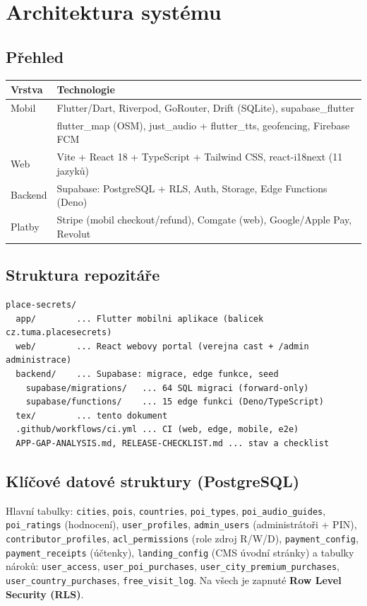 \documentclass[11pt,a4paper]{article}
\newcommand{\code}[1]{\texttt{#1}}
\begin{document}
\section{Architektura systému}

\subsection{Přehled}
\begin{center}
\begin{tabular}{@{}ll@{}}
\toprule
\textbf{Vrstva} & \textbf{Technologie} \\
\midrule
Mobil & Flutter/Dart, Riverpod, GoRouter, Drift (SQLite), supabase\_flutter \\
      & flutter\_map (OSM), just\_audio + flutter\_tts, geofencing, Firebase FCM \\
Web   & Vite + React 18 + TypeScript + Tailwind CSS, react-i18next (11 jazyků) \\
Backend & Supabase: PostgreSQL + RLS, Auth, Storage, Edge Functions (Deno) \\
Platby & Stripe (mobil checkout/refund), Comgate (web), Google/Apple Pay, Revolut \\
\bottomrule
\end{tabular}
\end{center}

\subsection{Struktura repozitáře}
\begin{lstlisting}
place-secrets/
  app/        ... Flutter mobilni aplikace (balicek cz.tuma.placesecrets)
  web/        ... React webovy portal (verejna cast + /admin administrace)
  backend/    ... Supabase: migrace, edge funkce, seed
    supabase/migrations/   ... 64 SQL migraci (forward-only)
    supabase/functions/    ... 15 edge funkci (Deno/TypeScript)
  tex/        ... tento dokument
  .github/workflows/ci.yml ... CI (web, edge, mobile, e2e)
  APP-GAP-ANALYSIS.md, RELEASE-CHECKLIST.md ... stav a checklist
\end{lstlisting}

\subsection{Klíčové datové struktury (PostgreSQL)}
Hlavní tabulky: \code{cities}, \code{pois}, \code{countries}, \code{poi\_types},
\code{poi\_audio\_guides}, \code{poi\_ratings} (hodnocení), \code{user\_profiles},
\code{admin\_users} (administrátoři + PIN), \code{contributor\_profiles},
\code{acl\_permissions} (role \texttimes{} zdroj \texttimes{} R/W/D),
\code{payment\_config}, \code{payment\_receipts} (účtenky), \code{landing\_config}
(CMS úvodní stránky) a tabulky nároků: \code{user\_access},
\code{user\_poi\_purchases}, \code{user\_city\_premium\_purchases},
\code{user\_country\_purchases}, \code{free\_visit\_log}. Na všech je zapnuté
\textbf{Row Level Security (RLS)}.
\end{document}
